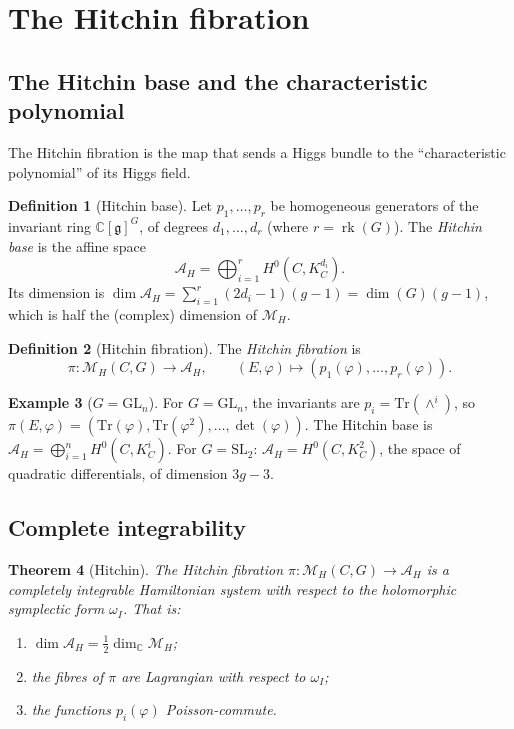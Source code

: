 \documentclass[11pt]{article}
\newtheorem{theorem}{Theorem}[section]
\theoremstyle{definition}
\newtheorem{definition}[theorem]{Definition}
\newtheorem{example}[theorem]{Example}
\theoremstyle{remark}
\newcommand{\Tr}{\mathrm{Tr}}
\newcommand{\frakg}{\mathfrak{g}}
\newcommand{\cA}{\mathcal{A}}
\newcommand{\cM}{\mathcal{M}}
\DeclareMathOperator{\rk}{rk}
\begin{document}
\section{The Hitchin fibration}
\label{sec:hitchin-fibration}

\subsection{The Hitchin base and the characteristic polynomial}

The Hitchin fibration is the map that sends a Higgs bundle to the ``characteristic polynomial'' of its Higgs field.

\begin{definition}[Hitchin base]
\label{def:hitchin-base}
Let $p_1, \ldots, p_r$ be homogeneous generators of the invariant ring $\mathbb{C}[\frakg]^G$, of degrees $d_1, \ldots, d_r$ (where $r = \rk(G)$). The \emph{Hitchin base} is the affine space
\[
 \cA_H = \bigoplus_{i=1}^r H^0(C, K_C^{d_i}).
\]
Its dimension is $\dim \cA_H = \sum_{i=1}^r (2d_i - 1)(g - 1) = \dim(G)(g-1)$, which is half the (complex) dimension of $\cM_H$.
\end{definition}

\begin{definition}[Hitchin fibration]
\label{def:hitchin-fibration}
The \emph{Hitchin fibration} is
\[
 \pi \colon \cM_H(C, G) \longrightarrow \cA_H, \qquad (E, \varphi) \longmapsto (p_1(\varphi), \ldots, p_r(\varphi)).
\]
\end{definition}

\begin{example}[$G = \mathrm{GL}_n$]
\label{ex:hitchin-gln}
For $G = \mathrm{GL}_n$, the invariants are $p_i = \Tr(\wedge^i)$, so $\pi(E, \varphi) = (\Tr(\varphi), \Tr(\varphi^2), \ldots, \det(\varphi))$. The Hitchin base is $\cA_H = \bigoplus_{i=1}^n H^0(C, K_C^i)$. For $G = \mathrm{SL}_2$: $\cA_H = H^0(C, K_C^2)$, the space of quadratic differentials, of dimension $3g - 3$.
\end{example}

\subsection{Complete integrability}

\begin{theorem}[Hitchin]
\label{thm:hitchin-integrable}
The Hitchin fibration $\pi \colon \cM_H(C, G) \to \cA_H$ is a completely integrable Hamiltonian system with respect to the holomorphic symplectic form $\omega_I$. That is:
\begin{enumerate}[label=(\roman*)]
 \item $\dim \cA_H = \frac{1}{2} \dim_\mathbb{C} \cM_H$;
 \item the fibres of $\pi$ are Lagrangian with respect to $\omega_I$;
 \item the functions $p_i(\varphi)$ Poisson-commute.
\end{enumerate}
\end{theorem}
\end{document}
